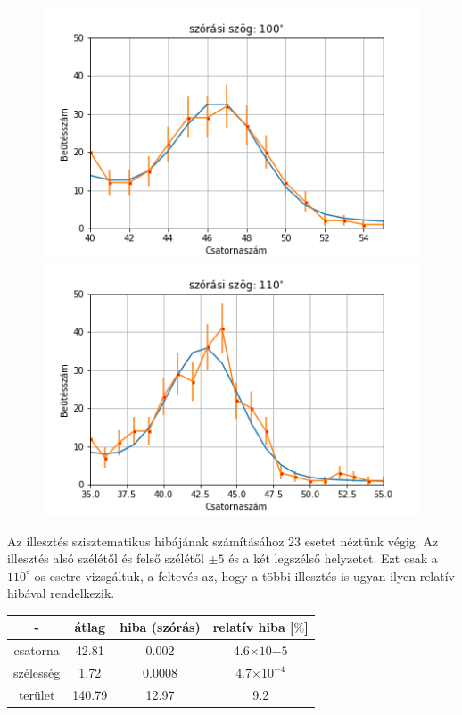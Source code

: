 \documentclass[a4paper,12pt]{article}
\begin{document}
\begin{figure}[!htb]
\begin{minipage}{.49\textwidth}
    \end{minipage}
    \begin{minipage}{.49\textwidth}
        \centering
        \includegraphics[width=1.\linewidth]{../plots/withbackground/100_1113fit.png}
    \end{minipage}
    \begin{minipage}{.49\textwidth}
        \centering
        \includegraphics[width=1.\linewidth]{../plots/withbackground/110_1098fit.png}
    \end{minipage}
\end{figure}

\newpage

\par Az illesztés szisztematikus hibájának számításához 23 esetet néztünk végig. Az illesztés alsó szélétől és felső szélétől $\pm 5$ és a két legszélső helyzetet. Ezt csak a $110^{\circ}$-os esetre vizsgáltuk, a feltevés az, hogy a többi illesztés is ugyan ilyen relatív hibával rendelkezik.

\begin{center}
\begin{tabular}{|c|c|c|c|}
\hline
- & átlag & hiba (szórás) & relatív hiba [$\%$] \\
\hline
csatorna & 42.81 & 0.002 & 4.6$\times 10{-5}$ \\
\hline
szélesség & 1.72 & 0.0008 & 4.7$\times 10^{-4}$ \\
\hline
terület & 140.79 & 12.97 & 9.2 \\
\hline

\end{tabular}
\end{center}
\end{document}
